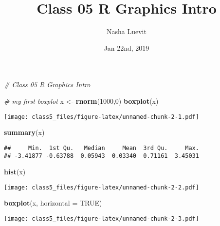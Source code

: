 \documentclass[]{article}
\title{Class 05 R Graphics Intro}
\author{Nasha Luevit}
\date{Jan 22nd, 2019}
\newenvironment{Shaded}{\begin{snugshade}}{\end{snugshade}}
\newcommand{\KeywordTok}[1]{\textcolor[rgb]{0.13,0.29,0.53}{\textbf{#1}}}
\newcommand{\DataTypeTok}[1]{\textcolor[rgb]{0.13,0.29,0.53}{#1}}
\newcommand{\DecValTok}[1]{\textcolor[rgb]{0.00,0.00,0.81}{#1}}
\newcommand{\StringTok}[1]{\textcolor[rgb]{0.31,0.60,0.02}{#1}}
\newcommand{\CommentTok}[1]{\textcolor[rgb]{0.56,0.35,0.01}{\textit{#1}}}
\newcommand{\OtherTok}[1]{\textcolor[rgb]{0.56,0.35,0.01}{#1}}
\newcommand{\NormalTok}[1]{#1}
\begin{document}
\maketitle

\begin{Shaded}
\begin{Highlighting}[]
\CommentTok{# Class 05 R Graphics Intro}
\end{Highlighting}
\end{Shaded}

\begin{Shaded}
\begin{Highlighting}[]
\CommentTok{# my first boxplot }
\NormalTok{x <-}\StringTok{ }\KeywordTok{rnorm}\NormalTok{(}\DecValTok{1000}\NormalTok{,}\DecValTok{0}\NormalTok{)}
\KeywordTok{boxplot}\NormalTok{(x)}
\end{Highlighting}
\end{Shaded}

\texttt{[image: class5\_files/figure-latex/unnamed-chunk-2-1.pdf]}

\begin{Shaded}
\begin{Highlighting}[]
\KeywordTok{summary}\NormalTok{(x)}
\end{Highlighting}
\end{Shaded}

\begin{verbatim}
##     Min.  1st Qu.   Median     Mean  3rd Qu.     Max. 
## -3.41877 -0.63788  0.05943  0.03340  0.71161  3.45031
\end{verbatim}

\begin{Shaded}
\begin{Highlighting}[]
\KeywordTok{hist}\NormalTok{(x)}
\end{Highlighting}
\end{Shaded}

\texttt{[image: class5\_files/figure-latex/unnamed-chunk-2-2.pdf]}

\begin{Shaded}
\begin{Highlighting}[]
\KeywordTok{boxplot}\NormalTok{(x, }\DataTypeTok{horizontal =} \OtherTok{TRUE}\NormalTok{)}
\end{Highlighting}
\end{Shaded}

\texttt{[image: class5\_files/figure-latex/unnamed-chunk-2-3.pdf]}
\end{document}
